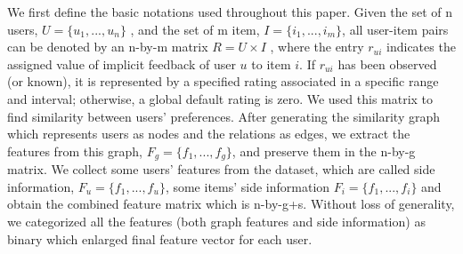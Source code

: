 \documentclass[a4paper,fleqn]{cas-dc}
\begin{document}
We first define the basic notations used throughout this paper. Given the set of n users, $U = \{u_1, ... , u_n\}$ , and the set of m item, $I = \{i_1, ... , i_m\}$, all user-item pairs can be denoted by an n-by-m matrix $R = U \times I$ , where the entry $r_{ui}$  indicates the assigned value of implicit feedback of user $u$ to item $i$. If $r_{ui}$ has been observed (or known), it is represented by a specified rating associated in a specific range and interval; otherwise, a global default rating is zero. We used this matrix to find similarity between users' preferences. After generating the similarity graph which represents users as nodes and the relations as edges, we extract the features from this graph, $F_g = \{f_1, ... , f_g\}$, and preserve them in the n-by-g matrix. We collect some users' features from the dataset, which are called side information, $F_u = \{f_1, ... , f_u\}$, some items' side information $F_i = \{f_1, ... , f_i\}$ and obtain the combined feature matrix which is n-by-g+s. Without loss of generality, we categorized all the features (both graph features and side information) as binary which enlarged final feature vector for each user.
\end{document}
